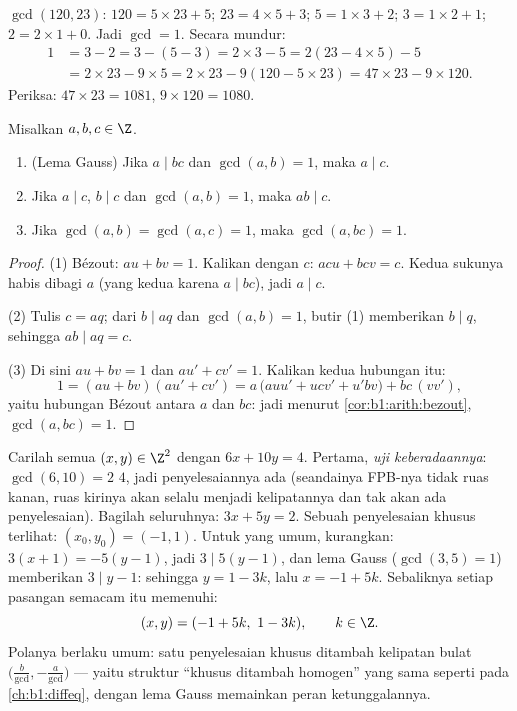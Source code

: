 \begin{example}\label{ex:b1:arith:euclid}
$\gcd(120, 23)$: $120 = 5 \times 23 + 5$; $23 = 4 \times 5 + 3$; $5 =
1\times 3 + 2$; $3 = 1 \times 2 + 1$; $2 = 2 \times 1 + 0$. Jadi
$\gcd = 1$. Secara mundur:
\begin{align*}
1 &= 3 - 2 = 3 - (5 - 3) = 2\times 3 - 5 = 2(23 - 4\times 5) - 5 \\
&= 2 \times 23 - 9 \times 5 = 2\times 23 - 9(120 - 5\times 23)
= 47 \times 23 - 9 \times 120 .
\end{align*}
Periksa: $47 \times 23 = 1081$, $9 \times 120 = 1080$.
\end{example}

\begin{theorem}\label{thm:b1:arith:gauss}
Misalkan $a, b, c \in \Z$.
\begin{enumerate}
  \item (Lema Gauss) Jika $a \mid bc$ dan
        $\gcd(a, b) = 1$, maka $a \mid c$.
  \item Jika $a \mid c$, $b \mid c$ dan $\gcd(a,b) = 1$, maka $ab \mid
        c$.
  \item Jika $\gcd(a, b) = \gcd(a, c) = 1$, maka $\gcd(a, bc) = 1$.
\end{enumerate}
\end{theorem}

\begin{proof}
(1) Bézout: $au + bv = 1$. Kalikan dengan $c$: $acu + bcv = c$. Kedua
sukunya habis dibagi $a$ (yang kedua karena $a \mid bc$), jadi $a
\mid c$.

(2) Tulis $c = aq$; dari $b \mid aq$ dan $\gcd(a, b) = 1$, butir (1)
memberikan $b \mid q$, sehingga $ab \mid aq = c$.

(3) Di sini $au + bv = 1$ dan $au' + cv' = 1$. Kalikan kedua
hubungan itu:
\[
1 = (au + bv)(au' + cv')
= a\,\bigl(auu' + ucv' + u'bv\bigr) + bc\,(vv') ,
\]
yaitu hubungan Bézout antara $a$ dan $bc$: jadi menurut
\cref{cor:b1:arith:bezout}, $\gcd(a, bc) = 1$.
\end{proof}

\begin{example}\label{ex:b1:arith:diophantine}
Carilah semua $(x, y) \in \Z^2$ dengan $6x + 10y = 4$. Pertama, \emph{uji
keberadaannya}: $\gcd(6, 10) = 2$  $4$, jadi penyelesaiannya
ada (seandainya FPB-nya tidak  ruas kanan, ruas kirinya
akan selalu menjadi kelipatannya dan tak akan ada penyelesaian). Bagilah
seluruhnya: $3x + 5y = 2$. Sebuah penyelesaian khusus terlihat: $(x_0,
y_0) = (-1, 1)$. Untuk yang umum, kurangkan: $3(x + 1) = -5(y -
1)$, jadi $3 \mid 5(y-1)$, dan lema Gauss ($\gcd(3,5) = 1$) memberikan
$3 \mid y - 1$: sehingga $y = 1 - 3k$, lalu $x = -1 + 5k$. Sebaliknya setiap
pasangan semacam itu memenuhi:
\[
(x, y) = (-1 + 5k,\ 1 - 3k), \qquad k \in \Z .
\]
Polanya berlaku umum: satu penyelesaian khusus ditambah kelipatan bulat
$\bigl(\frac b{\gcd}, -\frac a{\gcd}\bigr)$ --- yaitu struktur
``khusus ditambah homogen'' yang sama seperti pada
\cref{ch:b1:diffeq}, dengan lema Gauss memainkan peran
ketunggalannya.
\end{example}

